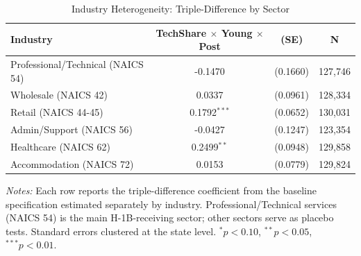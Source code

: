 \begin{table}[htbp]
\centering
\caption{Industry Heterogeneity: Triple-Difference by Sector}
\label{tab:industry}
\begin{tabular}{lccc}
\toprule
Industry & TechShare $\times$ Young $\times$ Post & (SE) & N \\
\midrule
Professional/Technical (NAICS 54) & -0.1470 & (0.1660) & 127,746 \\
Wholesale (NAICS 42) & 0.0337 & (0.0961) & 128,334 \\
Retail (NAICS 44-45) & 0.1792$^{***}$ & (0.0652) & 130,031 \\
Admin/Support (NAICS 56) & -0.0427 & (0.1247) & 123,354 \\
Healthcare (NAICS 62) & 0.2499$^{**}$ & (0.0948) & 129,858 \\
Accommodation (NAICS 72) & 0.0153 & (0.0779) & 129,824 \\
\bottomrule
\end{tabular}
\begin{tablenotes}[flushleft]
\small
\item \textit{Notes:} Each row reports the triple-difference coefficient from the baseline specification estimated separately by industry. Professional/Technical services (NAICS 54) is the main H-1B-receiving sector; other sectors serve as placebo tests. Standard errors clustered at the state level. $^{*}p<0.10$, $^{**}p<0.05$, $^{***}p<0.01$.
\end{tablenotes}
\end{table}

